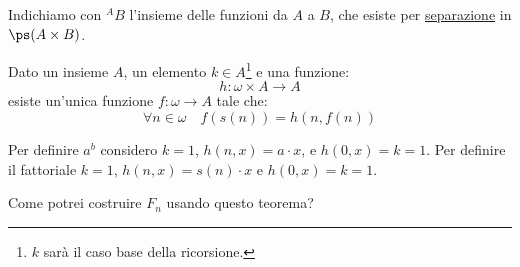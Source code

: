 \documentclass[11pt]{scrartcl}
\begin{document}
\begin{notation}
	Indichiamo con ${}^{A}B$ l'insieme delle funzioni da $A$ a $B$, che esiste per \hyperref[ax3]{separazione} in $\ps(A \times B)$.
\end{notation}

\begin{theorem}
	\label{ric1}
	Dato un insieme $A$, un elemento $k \in A$\footnote{$k$ sarà il caso base della ricorsione.} e una funzione:
	\[ h : \omega \times A \longrightarrow A
		\]
	esiste un'unica funzione $f : \omega \rightarrow A$ tale che:
	\[ \forall n \in \omega \quad f(s(n)) = h(n,f(n))
		\]
\end{theorem}

\begin{example}
	Per definire $a^b$ considero $k = 1$, $h(n,x) = a \cdot x$, e $h(0,x) = k = 1$. Per definire il fattoriale $k = 1$, $h(n,x) = s(n) \cdot x$ e $h(0,x) = k = 1$.
\end{example}

\begin{exercise}
	Come potrei costruire $F_n$ usando questo teorema?
\end{exercise}
\end{document}
